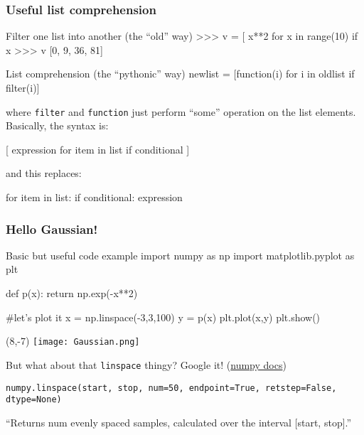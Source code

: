 \documentclass[hyperref={colorlinks=true}]{beamer}
\begin{document}

\begin{frame}[fragile]
  \frametitle{Useful list comprehension}

    \begin{ucpythonblock}{Filter one list into another (the ``old'' way)}
>>> v = [ x**2 for x in range(10) if x %
>>> v
[0, 9, 36, 81]
    \end{ucpythonblock}

    \begin{ucpythonblock}{List comprehension (the ``pythonic'' way)}
newlist = [function(i) for i in oldlist if filter(i)]
    \end{ucpythonblock}

where \texttt{filter} and \texttt{function} just perform ``some'' operation on the list elements. Basically, the syntax is:
    \begin{ucpythonblock}{}
[ expression for item in list if conditional ] 
    \end{ucpythonblock}

and this replaces:
    \begin{ucpythonblock}{}
for item in list:
  if conditional:
    expression
    \end{ucpythonblock}


\end{frame}


\begin{frame}[fragile]
  \frametitle{Hello Gaussian!}

\begin{ucpythonblock}{Basic but useful code example}
import numpy as np
import matplotlib.pyplot as plt

def p(x):
    return np.exp(-x**2)
    
#let's plot it
x = np.linspace(-3,3,100)
y = p(x)
plt.plot(x,y)
plt.show()
\end{ucpythonblock}
  
  \pause

  \begin{textblock}{12}(8,-7)
    \texttt{[image: Gaussian.png]}
  \end{textblock}  
  
  \pause
  
  But what about that \texttt{linspace} thingy? Google it! (\href{https://docs.scipy.org/doc/numpy-1.15.0/reference/generated/numpy.linspace.html}{numpy docs})
  
  \texttt{numpy.linspace(start, stop, num=50, endpoint=True, retstep=False, dtype=None)}
  
  ``Returns num evenly spaced samples, calculated over the interval [start, stop].''
  
\end{frame}
\end{document}
